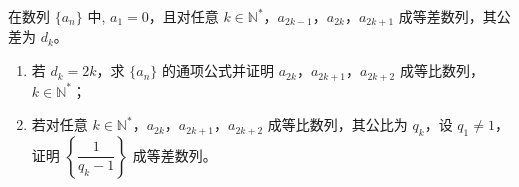 \begin{example}
    在数列 \(\{a_n\}\) 中, \(a_1 = 0\)，且对任意 \(k \in \mathbb{N}^*\)，\(a_{2k-1}\)，\(a_{2k}\)，\(a_{2k+1}\) 成等差数列，其公差为 \(d_k\)。

\begin{enumerate}
    \item 若 \(d_k = 2k\)，求 \(\{a_n\}\) 的通项公式并证明 \(a_{2k}\)，\(a_{2k+1}\)，\(a_{2k+2}\) 成等比数列，\(k \in \mathbb{N}^*\)；
    \item 若对任意 \(k \in \mathbb{N}^*\)，\(a_{2k}\)，\(a_{2k+1}\)，\(a_{2k+2}\) 成等比数列，其公比为 \(q_k\)，设 \(q_1 \neq 1\)，证明 \(\left\{\dfrac{1}{q_k - 1}\right\}\) 成等差数列。
\end{enumerate}
\end{example}

\clearpage
